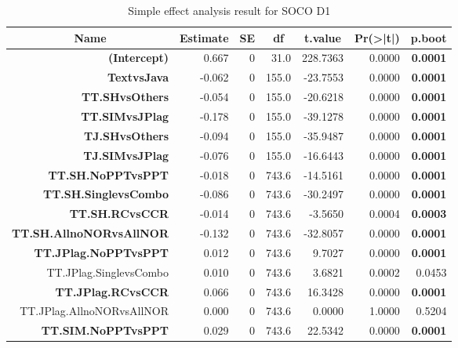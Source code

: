 \documentclass[a4paper, 12pt, oneside, openany, final, pdftex]{book}\usepackage[]{graphicx}\usepackage[]{color}
\begin{document}
\begin{table}
	\centering 
	\caption{Simple effect analysis result for SOCO D1}\label{tbl:simpleEffectAnalysisSOCOD1}

\begin{threeparttable}
\begin{tabular}{rrrrrrr}
\toprule
\multicolumn{1}{c}{\textbf{Name}} & \multicolumn{1}{c}{\textbf{Estimate}} & \multicolumn{1}{c}{\textbf{SE}} & \multicolumn{1}{c}{\textbf{df}} & \multicolumn{1}{c}{\textbf{t.value}} & \multicolumn{1}{c}{\textbf{Pr(>|t|)}} & \multicolumn{1}{c}{\textbf{p.boot}}\\
\midrule
\rowcolor{gray!6}  \textbf{(Intercept)} & 0.667 & 0 & 31.0 & 228.7363 & 0.0000 & \textbf{0.0001}\\
\textbf{TextvsJava} & -0.062 & 0 & 155.0 & -23.7553 & 0.0000 & \textbf{0.0001}\\
\rowcolor{gray!6}  \textbf{TT.SHvsOthers} & -0.054 & 0 & 155.0 & -20.6218 & 0.0000 & \textbf{0.0001}\\
\textbf{TT.SIMvsJPlag} & -0.178 & 0 & 155.0 & -39.1278 & 0.0000 & \textbf{0.0001}\\
\rowcolor{gray!6}  \textbf{TJ.SHvsOthers} & -0.094 & 0 & 155.0 & -35.9487 & 0.0000 & \textbf{0.0001}\\
\textbf{TJ.SIMvsJPlag} & -0.076 & 0 & 155.0 & -16.6443 & 0.0000 & \textbf{0.0001}\\
\hline
\rowcolor{gray!6}  \textbf{TT.SH.NoPPTvsPPT} & -0.018 & 0 & 743.6 & -14.5161 & 0.0000 & \textbf{0.0001}\\
\textbf{TT.SH.SinglevsCombo} & -0.086 & 0 & 743.6 & -30.2497 & 0.0000 & \textbf{0.0001}\\
\rowcolor{gray!6}  \textbf{TT.SH.RCvsCCR} & -0.014 & 0 & 743.6 & -3.5650 & 0.0004 & \textbf{0.0003}\\
\textbf{TT.SH.AllnoNORvsAllNOR} & -0.132 & 0 & 743.6 & -32.8057 & 0.0000 & \textbf{0.0001}\\
\rowcolor{gray!6}  \textbf{TT.JPlag.NoPPTvsPPT} & 0.012 & 0 & 743.6 & 9.7027 & 0.0000 & \textbf{0.0001}\\
TT.JPlag.SinglevsCombo & 0.010 & 0 & 743.6 & 3.6821 & 0.0002 & 0.0453\\
\rowcolor{gray!6}  \textbf{TT.JPlag.RCvsCCR} & 0.066 & 0 & 743.6 & 16.3428 & 0.0000 & \textbf{0.0001}\\
TT.JPlag.AllnoNORvsAllNOR & 0.000 & 0 & 743.6 & 0.0000 & 1.0000 & 0.5204\\
\rowcolor{gray!6}  \textbf{TT.SIM.NoPPTvsPPT} & 0.029 & 0 & 743.6 & 22.5342 & 0.0000 & \textbf{0.0001}\\

\end{tabular}
\end{threeparttable}
\end{table}
\end{document}
